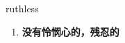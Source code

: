 
\begin{frame}
{\huge ruthless}
\begin{center}
\begin{enumerate}\Large
  \item \textbf{没有怜悯心的，残忍的}
\end{enumerate}
\end{center}
\end{frame}
